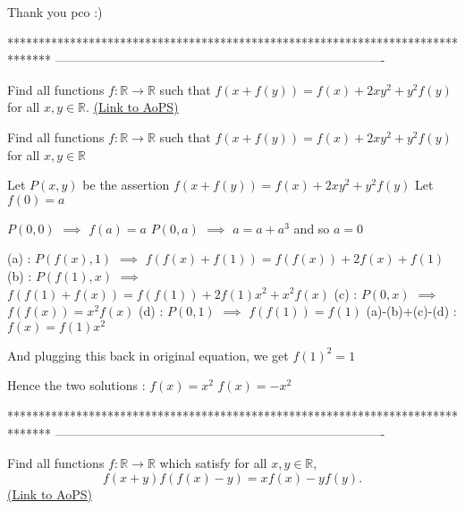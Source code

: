 \begin{solution}
	Thank you pco :)
\end{solution}
*******************************************************************************
-------------------------------------------------------------------------------

\begin{problem}
	Find all functions $f:\mathbb{R} \rightarrow \mathbb{R}$ such that $f(x+f(y))=f(x)+2xy^2 +y^2 f(y) $ for all $x,y \in \mathbb{R} $.
	\flushright \href{https://artofproblemsolving.com/community/c6h399024}{(Link to AoPS)}
\end{problem}



\begin{solution}
	\begin{tcolorbox}Find all functions $f:\mathbb{R} \rightarrow \mathbb{R}$ such that $f(x+f(y))=f(x)+2xy^2 +y^2 f(y) $ for all $x,y \in \mathbb{R} $\end{tcolorbox}
Let $P(x,y)$ be the assertion $f(x+f(y))=f(x)+2xy^2+y^2f(y)$
Let $f(0)=a$

$P(0,0)$ $\implies$ $f(a)=a$
$P(0,a)$ $\implies$ $a=a+a^3$
and so $a=0$

(a) : $P(f(x),1)$ $\implies$ $f(f(x)+f(1))=f(f(x))+2f(x)+f(1)$
(b) : $P(f(1),x)$ $\implies$ $f(f(1)+f(x))=f(f(1))+2f(1)x^2+x^2f(x)$
(c) : $P(0,x)$ $\implies$ $f(f(x))=x^2f(x)$
(d) : $P(0,1)$ $\implies$ $f(f(1))=f(1)$
(a)-(b)+(c)-(d) : $f(x)=f(1)x^2$

And plugging this back in original equation, we get $f(1)^2=1$

Hence the two solutions :
$f(x)=x^2$
$f(x)=-x^2$
\end{solution}
*******************************************************************************
-------------------------------------------------------------------------------

\begin{problem}
	Find all functions $f: \mathbb R \to \mathbb R$ which satisfy for all $x, y \in \mathbb R $,
\[f(x+y)f( f(x)-y )=xf(x)-yf(y).\]
	\flushright \href{https://artofproblemsolving.com/community/c6h399531}{(Link to AoPS)}
\end{problem}



